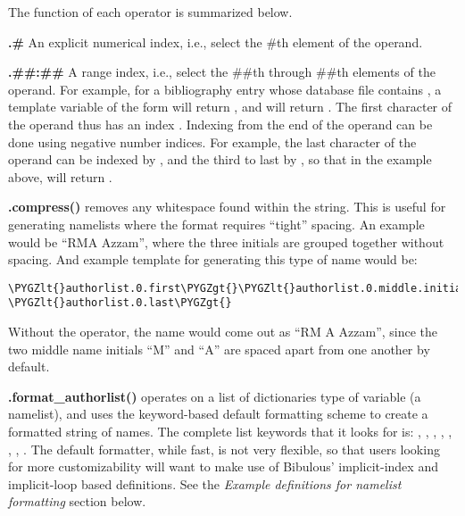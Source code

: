 \documentclass[letterpaper,10pt,english]{sphinxmanual}
\def\PYGZlt{\char`\<}
\def\PYGZgt{\char`\>}
\begin{document}
The function of each operator is summarized below.

\textbf{.\#} An explicit numerical index, i.e., select the \#th element of the operand.

\textbf{.\#\#:\#\#} A range index, i.e., select the \#\#th through \#\#th elements of the operand. For example, for a bibliography entry whose database file contains , a template variable of the form  will return , and  will return . The first character of the operand thus has an index . Indexing from the end of the operand can be done using negative number indices. For example, the last character of the operand can be indexed by , and the third to last by , so that in the example above,  will return .

\textbf{.compress()} removes any whitespace found within the string. This is useful for generating namelists where the format requires ``tight'' spacing. An example would be ``RMA Azzam'', where the three initials are grouped together without spacing. And example template for generating this type of name would be:

\begin{Verbatim}[commandchars=\\\{\}]
\PYGZlt{}authorlist.0.first\PYGZgt{}\PYGZlt{}authorlist.0.middle.initial().compress()\PYGZgt{} \PYGZlt{}authorlist.0.last\PYGZgt{}
\end{Verbatim}

Without the  operator, the name would come out as ``RM A Azzam'', since the two middle name initials ``M'' and ``A'' are spaced apart from one another by default.

\textbf{.format\_authorlist()} operates on a list of dictionaries type of variable (a namelist), and uses the keyword-based default formatting scheme to create a formatted string of names. The complete list keywords that it looks for is: , , , , , , , . The default formatter, while fast, is not very flexible, so that users looking for more customizability will want to make use of Bibulous' implicit-index and implicit-loop based definitions. See the \emph{Example definitions for namelist formatting} section below.
\end{document}
